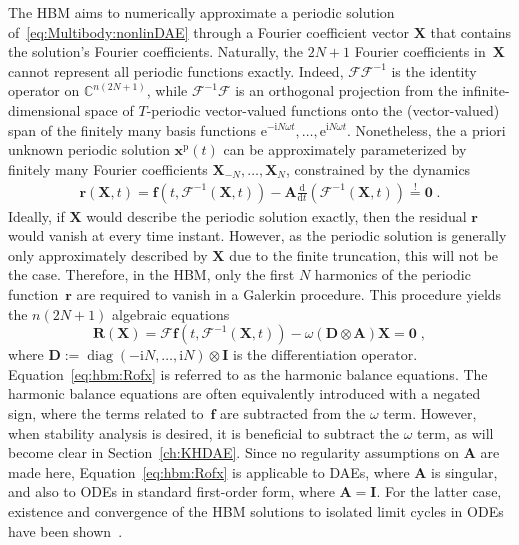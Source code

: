 \documentclass[a4paper, nonatbib, 3p, twocolumn]{elsarticle}
\theoremstyle{plain}
\theoremstyle{definition}
\theoremstyle{remark}
\newcommand{\diff}[1][]{\mathrm{d}#1}
\newcommand{\td}[2]{\frac{\diff #1}{\diff #2}}
\newcommand{\diag}{{\mathop{\mathrm{diag}}}}
\newcommand{\ic}{\ri} %
\newcommand{\ex}{\re} %
\newcommand{\vzero}{\mathbf{0}}
\newcommand{\Cspace}{\mathbb{C}}
\newcommand{\re}{\mathrm e}
\newcommand{\ri}{\mathrm i}
\newcommand{\rp}{\mathrm p}
\newcommand{\vf}{\mathbf f}
\newcommand{\vr}{\mathbf r}
\newcommand{\vx}{\mathbf x}
\newcommand{\vA}{\mathbf A}
\newcommand{\vD}{\mathbf D}
\newcommand{\vI}{\mathbf I}
\newcommand{\vR}{\mathbf R}
\newcommand{\vX}{\mathbf X}
\newcommand{\cF}{\mathcal{F}}
\begin{document}
The HBM aims to numerically approximate a periodic solution of~\eqref{eq:Multibody:nonlinDAE} through a Fourier coefficient vector $\vX$ that contains the solution's Fourier coefficients.
Naturally, the $2N+1$ Fourier coefficients in~$\vX$ cannot represent all periodic functions exactly. Indeed, $\cF \cF^{-1}$ is the identity operator on $\Cspace^{n(2N+1)}$, while $\cF^{-1} \cF$ is an orthogonal projection from the infinite-dimensional space of $T$-periodic vector-valued functions onto the (vector-valued) span of the finitely many basis functions $\ex^{-\ic N \omega t}, \dots, \ex^{\ic N \omega t}$.
Nonetheless, the a priori unknown periodic solution $\vx^{\rp}(t)$ can be approximately parameterized by finitely many Fourier coefficients $\vX_{-N}, \dots, \vX_{N}$,
constrained by the dynamics
\begin{align}\label{eq:background:residu}
	\vr(\vX, t) = \vf(t, \cF^{-1}(\vX, t)) - \vA \td{}{t} \left(\cF ^{-1}(\vX, t)\right) \overset{!}{=}\vzero \;.
\end{align}
Ideally, if $\vX$ would describe the periodic solution exactly, then the residual $\vr$ would vanish at every time instant. However, as the periodic solution is generally only approximately described by $\vX$ due to the finite truncation, this will not be the case. Therefore, in the HBM, only the first $N$ harmonics of the periodic function~$\vr$ are required to vanish in a Galerkin procedure. This procedure
yields the $n(2N+1)$ algebraic equations
\begin{equation}
\label{eq:hbm:Rofx}
\vR(\vX) = \cF \vf\left(t, \cF^{-1}(\vX, t)\right) - \omega (\vD \otimes \vA) \vX = \vzero\;,
\end{equation}
where $\vD := \diag(-\ic N, \dots, \ic N) \otimes \vI$ is the differentiation operator. 
Equation~\eqref{eq:hbm:Rofx} is referred to as the harmonic balance equations.
The harmonic balance equations are often equivalently introduced with a negated sign, where the terms related to~$\vf$ are subtracted from the $\omega$ term. However, when stability analysis is desired, it is beneficial to subtract the $\omega$ term, as will become clear in Section~\ref{ch:KHDAE}. Since no regularity assumptions on $\vA$ are made here, Equation~\eqref{eq:hbm:Rofx} is applicable to DAEs, where $\vA$ is singular, and also to ODEs in standard first-order form, where $\vA = \vI$. For the latter case,
existence and convergence
of the HBM solutions to isolated limit cycles in ODEs have been shown~\cite{Urabe1965}. 
\end{document}
